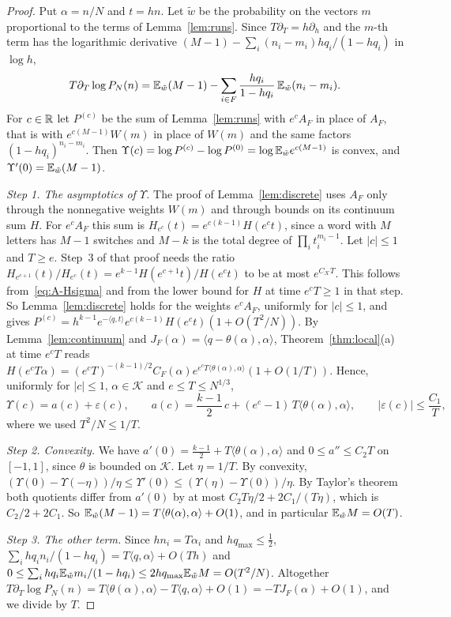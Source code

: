 \begin{proof}
Put $\alpha=n/N$ and $t=hn$. Let $\tilde w$ be the probability on the vectors $m$ proportional to
the terms of Lemma~\ref{lem:runs}. Since $T\partial_T=h\partial_h$ and the $m$-th term has
the logarithmic derivative $(M-1)-\sum_i(n_i-m_i)hq_i/(1-hq_i)$ in $\log h$,
\[
T\partial_T\log P_N(n)=\mathbb{E}_{\tilde w}(M-1)-\sum_{i\in F}\frac{hq_i}{1-hq_i}\,\mathbb{E}_{\tilde w}(n_i-m_i).
\]
For $c\in\mathbb{R}$ let $P^{(c)}$ be the sum of Lemma~\ref{lem:runs} with $e^cA_F$ in place of $A_F$,
that is with $e^{c(M-1)}W(m)$ in place of $W(m)$ and the same factors $(1-hq_i)^{n_i-m_i}$. Then
$\Upsilon(c)=\log P^{(c)}-\log P^{(0)}=\log\mathbb{E}_{\tilde w}e^{c(M-1)}$ is convex, and
$\Upsilon'(0)=\mathbb{E}_{\tilde w}(M-1)$.

\emph{Step 1. The asymptotics of $\Upsilon$.} The proof of Lemma~\ref{lem:discrete} uses $A_F$
only through the nonnegative weights $W(m)$ and through bounds on its continuum sum $H$. For
$e^cA_F$ this sum is $H_{e^c}(t)=e^{c(k-1)}H(e^ct)$, since a word with $M$ letters has $M-1$
switches and $M-k$ is the total degree of $\prod_it_i^{m_i-1}$. Let $|c|\le1$ and $T\ge e$. Step~3
of that proof needs the ratio $H_{e^{c+1}}(t)/H_{e^c}(t)=e^{k-1}H(e^{c+1}t)/H(e^ct)$ to be at most
$e^{C_{\mathcal K}T}$. This follows from~\eqref{eq:A-Hsigma} and from the lower bound for $H$ at
time $e^cT\ge1$ in that step. So Lemma~\ref{lem:discrete} holds for the weights $e^cA_F$,
uniformly for $|c|\le1$, and gives
$P^{(c)}=h^{k-1}e^{-\langle q,t\rangle}e^{c(k-1)}H(e^ct)(1+O(T^2/N))$. By
Lemma~\ref{lem:continuum} and $J_F(\alpha)=\langle q-\theta(\alpha),\alpha\rangle$,
Theorem~\ref{thm:local}(a) at time $e^cT$ reads
$H(e^cT\alpha)=(e^cT)^{-(k-1)/2}C_F(\alpha)e^{e^cT\langle\theta(\alpha),\alpha\rangle}(1+O(1/T))$.
Hence, uniformly for $|c|\le1$, $\alpha\in\mathcal K$ and $e\le T\le N^{1/3}$,
\[
\Upsilon(c)=a(c)+\varepsilon(c),\qquad a(c)=\frac{k-1}2\,c+(e^c-1)\,T\langle\theta(\alpha),\alpha\rangle,
\qquad|\varepsilon(c)|\le\frac{C_1}T,
\]
where we used $T^2/N\le1/T$.

\emph{Step 2. Convexity.} We have $a'(0)=\frac{k-1}2+T\langle\theta(\alpha),\alpha\rangle$ and
$0\le a''\le C_2T$ on $[-1,1]$, since $\theta$ is bounded on $\mathcal K$. Let $\eta=1/T$. By
convexity, $(\Upsilon(0)-\Upsilon(-\eta))/\eta\le\Upsilon'(0)\le(\Upsilon(\eta)-\Upsilon(0))/\eta$.
By Taylor's theorem both quotients differ from $a'(0)$ by at most $C_2T\eta/2+2C_1/(T\eta)$,
which is $C_2/2+2C_1$. So $\mathbb{E}_{\tilde w}(M-1)=T\langle\theta(\alpha),\alpha\rangle+O(1)$, and in
particular $\mathbb{E}_{\tilde w}M=O(T)$.

\emph{Step 3. The other term.} Since $hn_i=T\alpha_i$ and $hq_{\max}\le\frac12$,
$\sum_ihq_in_i/(1-hq_i)=T\langle q,\alpha\rangle+O(Th)$ and
$0\le\sum_ihq_i\mathbb{E}_{\tilde w}m_i/(1-hq_i)\le2hq_{\max}\mathbb{E}_{\tilde w}M=O(T^2/N)$. Altogether
$T\partial_T\log P_N(n)=T\langle\theta(\alpha),\alpha\rangle-T\langle q,\alpha\rangle+O(1)
=-TJ_F(\alpha)+O(1)$, and we divide by $T$.
\end{proof}

